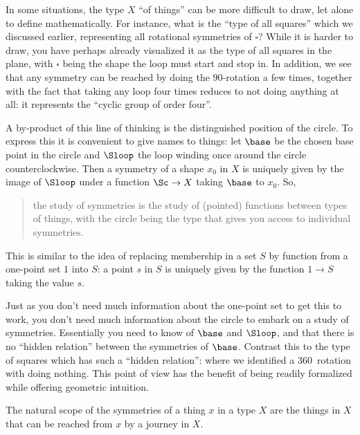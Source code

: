 
In some situations, the type $X$ ``of things'' can be more difficult to draw,
let alone to define mathematically.  For instance, what is the ``type of all squares'' which we discussed earlier, representing all rotational symmetries of $\square$?  While it is harder to draw, you have perhaps already visualized it as the type of all squares in the plane, with $\square$ being the shape the loop must start and stop in.  In addition, we see that any symmetry can be reached by doing the $90$\textdegree-rotation a few times, together with the fact that taking any loop four times reduces to not doing anything at all: it represents the ``cyclic group of order four''.

A by-product of this line of thinking is the distinguished position of the circle. To express this it is convenient to give names to things: let $\base$ be the chosen base point in the circle and $\Sloop$ the loop winding once around the circle counterclockwise. Then a symmetry of a shape $x_0$ in $X$ is uniquely given by the image of $\Sloop $ under a function $\Sc\to X$ taking $\base$ to $x_0$. So,
\begin{quote}
  the study of symmetries is the study of (pointed) functions between types of things, with the circle being the type that gives you access to individual symmetries.
\end{quote}

This is similar to the idea of replacing membership in a set $S$ by function from a one-point set $1$ into $S$: a point $s$ in $S$ is uniquely given by the function $1\to S$ taking the value $s$.


Just as you don't need much information about the one-point set to get this to work, you don't need much information about the circle to embark on a study of symmetries.
Essentially you need to know of $\base $ and $\Sloop $, and that there is no ``hidden relation'' between the symmetries of $\base$. Contrast this to the type of squares which has such a ``hidden relation'': where we identified a $360$\textdegree\ rotation with doing nothing.  This point of view has the benefit of being readily formalized while offering geometric intuition.


The natural scope of the symmetries of a thing $x$ in a type $X$
are the things in $X$ that can be reached from $x$ by a journey in $X$.

